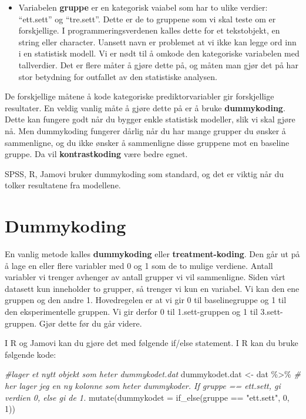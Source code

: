 \documentclass[
]{book}
\newenvironment{Shaded}{\begin{snugshade}}{\end{snugshade}}
\newcommand{\AttributeTok}[1]{\textcolor[rgb]{0.77,0.63,0.00}{#1}}
\newcommand{\CommentTok}[1]{\textcolor[rgb]{0.56,0.35,0.01}{\textit{#1}}}
\newcommand{\DecValTok}[1]{\textcolor[rgb]{0.00,0.00,0.81}{#1}}
\newcommand{\FunctionTok}[1]{\textcolor[rgb]{0.00,0.00,0.00}{#1}}
\newcommand{\NormalTok}[1]{#1}
\newcommand{\OtherTok}[1]{\textcolor[rgb]{0.56,0.35,0.01}{#1}}
\newcommand{\SpecialCharTok}[1]{\textcolor[rgb]{0.00,0.00,0.00}{#1}}
\newcommand{\StringTok}[1]{\textcolor[rgb]{0.31,0.60,0.02}{#1}}
\providecommand{\tightlist}{%
  \setlength{\itemsep}{0pt}\setlength{\parskip}{0pt}}
\begin{document}
\begin{itemize}
\tightlist
\item
  Variabelen \textbf{gruppe} er en kategorisk vaiabel som har to ulike verdier: ``ett.sett'' og ``tre.sett''. Dette er de to gruppene som vi skal teste om er forskjellige. I programmeringsverdenen kalles dette for et tekstobjekt, en string eller character. Uansett navn er problemet at vi ikke kan legge ord inn i en statistisk modell. Vi er nødt til å omkode den kategoriske variabelen med tallverdier. Det er flere måter å gjøre dette på, og måten man gjør det på har stor betydning for outfallet av den statistiske analysen.
\end{itemize}

De forskjellige måtene å kode kategoriske prediktorvariabler gir forskjellige resultater. En veldig vanlig måte å gjøre dette på er å bruke \textbf{dummykoding}. Dette kan fungere godt når du bygger enkle statistisk modeller, slik vi skal gjøre nå. Men dummykoding fungerer dårlig når du har mange grupper du ønsker å sammenligne, og du ikke ønsker å sammenligne disse gruppene mot en baseline gruppe. Da vil \textbf{kontrastkoding} være bedre egnet.

SPSS, R, Jamovi bruker dummykoding som standard, og det er viktig når du tolker resultatene fra modellene.

\hypertarget{dummykoding}{%
\section{Dummykoding}\label{dummykoding}}

En vanlig metode kalles \textbf{dummykoding} eller \textbf{treatment-koding}. Den går ut på å lage en eller flere variabler med 0 og 1 som de to mulige verdiene. Antall variabler vi trenger avhenger av antall grupper vi vil sammenligne. Siden vårt datasett kun inneholder to grupper, så trenger vi kun en variabel. Vi kan den ene gruppen og den andre 1. Hovedregelen er at vi gir 0 til baselinegruppe og 1 til den eksperimentelle gruppen. Vi gir derfor 0 til 1.sett-gruppen og 1 til 3.sett-gruppen. Gjør dette før du går videre.

I R og Jamovi kan du gjøre det med følgende if/else statement. I R kan du bruke følgende kode:

\begin{Shaded}
\begin{Highlighting}[]
\CommentTok{\#lager et nytt objekt som heter dummykodet.dat}
\NormalTok{dummykodet.dat }\OtherTok{\textless{}{-}}\NormalTok{ dat }\SpecialCharTok{\%\textgreater{}\%}
  \CommentTok{\# her lager jeg en ny kolonne som heter dummykoder. If gruppe == \textquotesingle{}ett.sett\textquotesingle{}, gi verdien 0, else gi de 1.}
  \FunctionTok{mutate}\NormalTok{(}\AttributeTok{dummykodet =} \FunctionTok{if\_else}\NormalTok{(gruppe }\SpecialCharTok{==} \StringTok{"ett.sett"}\NormalTok{, }\DecValTok{0}\NormalTok{, }\DecValTok{1}\NormalTok{))}
\end{Highlighting}
\end{Shaded}
\end{document}
